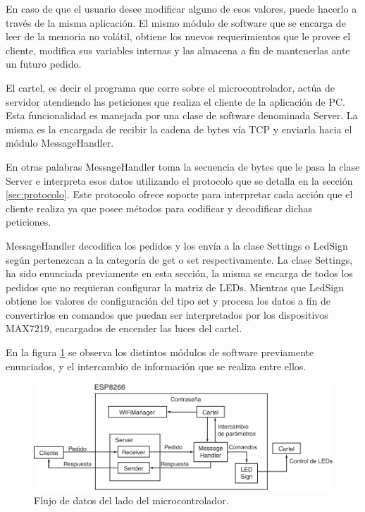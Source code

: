 En caso de que el usuario desee modificar alguno de esos valores, puede hacerlo a través de la misma aplicación.
El mismo módulo de software que se encarga de leer de la memoria no volátil, obtiene los nuevos requerimientos que le provee el cliente, modifica sus variables internas y las almacena a fin de mantenerlas ante un futuro pedido.

El cartel, es decir el programa que corre sobre el microcontrolador, actúa de servidor atendiendo las peticiones que realiza el cliente de la aplicación de PC.
Esta funcionalidad es manejada por una clase de software denominada Server.
La misma es la encargada de recibir la cadena de bytes vía TCP y enviarla hacia el módulo MessageHandler.

En otras palabras MessageHandler toma la secuencia de bytes que le pasa la clase Server e interpreta esos datos utilizando el protocolo que se detalla en la sección \ref{sec:protocolo}.
Este protocolo ofrece soporte para interpretar cada acción que el cliente realiza ya que posee métodos para codificar y decodificar dichas peticiones.

MessageHandler decodifica los pedidos y los envía a la clase Settings o LedSign según pertenezcan a la categoría de get o set respectivamente.
La clase Settings, ha sido enunciada previamente en esta sección, la misma se encarga de todos los pedidos que no requieran configurar la matriz de LEDs.
Mientras que LedSign obtiene los valores de configuración del tipo set y procesa los datos a fin de convertirlos en comandos que puedan ser interpretados por los dispositivos MAX7219, encargados de encender las luces del cartel.

En la figura \ref{fig:flujo_de_datos} se observa los distintos módulos de software previamente enunciados, y el intercambio de información que se realiza entre ellos.


\begin{figure}[!ht]
	\centering
	\includegraphics[width=1\linewidth]{imagenes/diagrama-bloque.pdf}
	\caption{Flujo de datos del lado del microcontrolador.}
	\label{fig:flujo_de_datos}
\end{figure}

